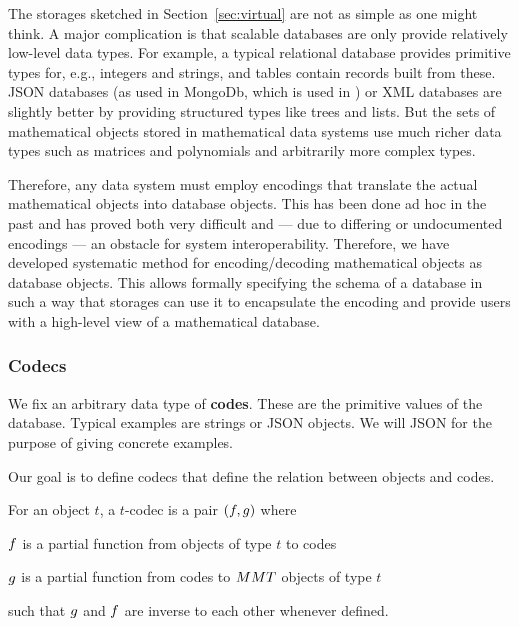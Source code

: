 The storages sketched in Section~\ref{sec:virtual} are not as simple as one might think.
A major complication is that scalable databases are only provide relatively low-level data types.
For example, a typical relational database provides primitive types for, e.g., integers and strings, and tables contain records built from these.
JSON databases (as used in MongoDb\cite{}, which is used in \LMFDB) or XML databases are slightly better by providing structured types like trees and lists.
But the sets of mathematical objects stored in mathematical data systems use much richer data types such as matrices and polynomials and arbitrarily more complex types.

Therefore, any data system must employ encodings that translate the actual mathematical objects into database objects.
This has been done ad hoc in the past and has proved both very difficult and --- due to differing or undocumented encodings --- an obstacle for system interoperability.
Therefore, we have developed systematic method for encoding/decoding mathematical objects as database objects.
This allows formally specifying the schema of a database in such a way that \MMT storages can use it to encapsulate the encoding and provide users with a high-level view of a mathematical database.


\subsubsection{Codecs}

We fix an arbitrary data type of \textbf{codes}.
These are the primitive values of the database.
Typical examples are strings or JSON objects.
We will JSON for the purpose of giving concrete examples.

Our goal is to define codecs that define the relation between \MMT objects and codes.

\begin{mydef}[Codec]
  For an \MMT object $t$, a $t$-codec is a pair $(f, g)$ where
  \begin{compactitem}
   \item $f$ is a partial function from \MMT objects of type $t$ to codes
   \item $g$ is a partial function from codes to $MMT$ objects of type $t$
  \end{compactitem}
  such that $g$ and $f$ are inverse to each other whenever defined.
\end{mydef}

